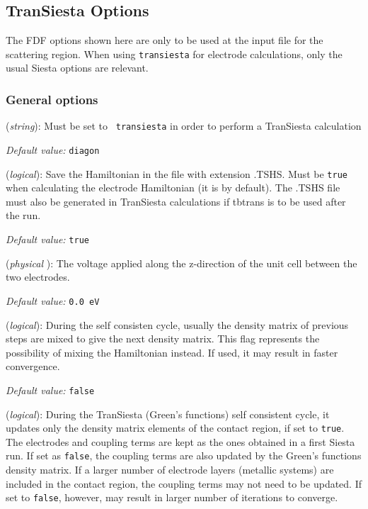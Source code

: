 \documentclass[11pt]{article}
\begin{document}
\subsection{{\sc TranSiesta} Options}

The FDF options shown here are only to be used at the input file for
the scattering region.  When using {\tt transiesta} for electrode
calculations, only the usual {\sc Siesta} options are relevant.

\subsubsection{General options}

\begin{description}
    \itemsep 10pt
    \parsep 0pt

    \item[{\bf SolutionMethod}] ({\it string}):
       Must be set to {\tt
        transiesta} in order to perform a {\sc TranSiesta} calculation

        {\it Default value:} {\tt diagon}

\item[{\bf TS.SaveHS}] ({\it logical}):  Save the Hamiltonian in the file with extension .TSHS.
  Must be {\tt true} when calculating the electrode Hamiltonian (it is
  by default).  The .TSHS file must also be generated in {\sc
    TranSiesta} calculations if tbtrans is to be used after the run.

{\it Default value:} {\tt true}

    \item[{\bf TS.Voltage}] ({\it physical }): The voltage applied
      along the z-direction of the unit cell between the two
      electrodes.

        {\it Default value:} {\tt 0.0 eV}

\item[{\bf TS.MixH}] ({\it logical}): 
  During the self consisten cycle, usually the density matrix of
  previous steps are mixed to give the next density matrix. This flag
  represents the possibility of mixing the Hamiltonian instead. If
  used, it may result in faster convergence.

{\it Default value:} {\tt false}

\item[{\bf TS.UpdateDMCROnly}] ({\it logical}):
   During the {\sc
    TranSiesta} (Green's functions) self consistent cycle, it updates
  only the density matrix elements of the contact region, if set to
  {\tt true}. The electrodes and coupling terms are kept as the ones
  obtained in a first {\sc Siesta} run. If set as {\tt false}, the
  coupling terms are also updated by the Green's functions density
  matrix. If a larger number of electrode layers (metallic systems)
  are included in the contact region, the coupling terms may not need
  to be updated. If set to {\tt false}, however, may result in larger
  number of iterations to converge.


\end{description}
\end{document}
